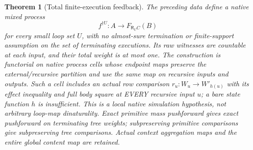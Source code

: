 \documentclass[11pt]{article}
\newtheorem{theorem}{Theorem}\newtheorem{lemma}[theorem]{Lemma}\newtheorem{proposition}[theorem]{Proposition}
\newcommand{\R}{\mathsf R}\newcommand{\Col}{\mathsf{Col}}\newcommand{\Vect}{\mathbf{Vect}_k}
\begin{document}
\begin{theorem}[Total finite-execution feedback]\label{thm:feedback}
The preceding data define a native mixed process
\[
 f^{\dagger U}:A\longrightarrow F_{\R_U C}(B)
\]
for every small loop set $U$, with no almost-sure termination or finite-support assumption on the set of terminating executions. Its raw witnesses are countable at each input, and their total weight is at most one. The construction is functorial on native process cells whose endpoint maps preserve the external/recursive partition and use the same map on recursive inputs and outputs. Such a cell includes an actual row comparison $r_u:W_u\to W'_{h(u)}$ with its effect inequality and full body square at EVERY recursive input $u$; a bare state function $h$ is insufficient. This is a local native simulation hypothesis, not arbitrary loop-map dinaturality. Exact primitive mass pushforward gives exact pushforward on terminating tree weights; subpreserving primitive comparisons give subpreserving tree comparisons. Actual context aggregation maps and the entire global content map are retained.
\end{theorem}
\end{document}
